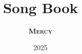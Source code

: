 \usepackage{array}
\usepackage[table]{xcolor}

\usepackage[chorded,noscripture]{songs}
\usepackage{lyluatex}

\usepackage{fontspec}
\usepackage{lilyglyphs}

\indexesoff

\renewcommand{\everychorus}{\textnote{Chorus:}}

\renewcommand{\lyricfont}{\sffamily\small}
\renewcommand{\printchord}[1]{\rmfamily\bf#1}


\title{Song Book}
\author{\textsc{\textbf{Mercy}}}
\date{2025}
